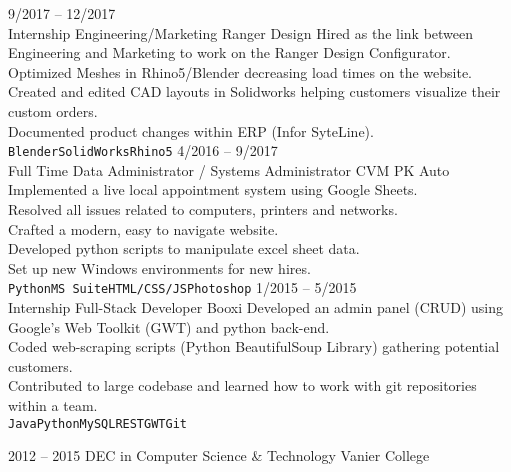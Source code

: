 \documentclass[9pt]{developercv} %
\begin{document}
\begin{entrylist}
	\entry
		{9/2017 -- 12/2017\\\footnotesize{Internship}}
		{Engineering/Marketing}
		{Ranger Design}
    {Hired as the link between Engineering and Marketing to work on the Ranger Design Configurator.\\
      Optimized Meshes in Rhino5/Blender decreasing load times on the website.\\
      Created and edited CAD layouts in Solidworks helping customers visualize their custom orders.\\
      Documented product changes within ERP (Infor SyteLine). 
      \\\texttt{Blender}\slashsep\texttt{SolidWorks}\slashsep\texttt{Rhino5}}
	\entry
		{4/2016 -- 9/2017\\\footnotesize{Full Time}}
		{Data Administrator / Systems Administrator}
		{CVM PK Auto}
    {Implemented a live local appointment system using Google Sheets.\\
      Resolved all issues related to computers, printers and networks.\\
      Crafted a modern, easy to navigate website.\\
      Developed python scripts to manipulate excel sheet data.\\
      Set up new Windows environments for new hires.
      \\\texttt{Python}\slashsep\texttt{MS Suite}\slashsep\texttt{HTML/CSS/JS}\slashsep\texttt{Photoshop}}
	\entry
		{1/2015 -- 5/2015\\\footnotesize{Internship}}
		{Full-Stack Developer}
		{Booxi}
    {Developed an admin panel (CRUD) using Google's Web Toolkit (GWT) and python back-end.\\
      Coded web-scraping scripts (Python BeautifulSoup Library) gathering potential customers.\\
      Contributed to large codebase and learned how to work with git repositories within a team.
      \\\texttt{Java}\slashsep\texttt{Python}\slashsep\texttt{MySQL}\slashsep\texttt{REST}\slashsep\texttt{GWT}\slashsep\texttt{Git}}
\end{entrylist}



\begin{entrylist}
	\entry
		{2012 -- 2015}
		{DEC in Computer Science \& Technology}
		{Vanier College}
		{}
\end{entrylist}
\end{document}
